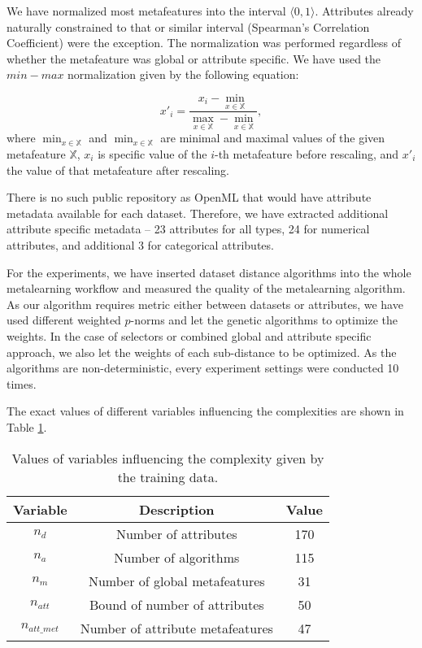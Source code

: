 \documentclass{article}
\begin{document}
\begin{refsegment}
We have normalized most metafeatures into the interval $\langle 0,1 \rangle$. Attributes already naturally constrained to that or similar interval (Spearman's Correlation Coefficient) were the exception. The normalization was performed regardless of whether the metafeature was global or attribute specific. We have used the $min-max$ normalization given by the following equation:

\begin{equation*}
x'_i=\frac{x_i - \min_{x \in \mathbb{X}}}{\max_{x \in \mathbb{X}}-\min_{x \in \mathbb{X}}},
\end{equation*}
where $\min_{x \in \mathbb{X}}$ and $\min_{x \in \mathbb{X}}$ are minimal and maximal values of the given metafeature $\mathbb{X}$, $x_i$ is specific value of the $i$-th metafeature before rescaling, and $x'_i$ the value of that metafeature after rescaling.

There is no such public repository as OpenML that would have attribute metadata available for each dataset.
Therefore, we have extracted additional attribute specific metadata -- 23 attributes for all types, 24 for numerical attributes, and additional 3 for categorical attributes.

For the experiments, we have inserted dataset distance algorithms into the whole metalearning workflow and measured the quality of the metalearning algorithm. As our algorithm requires metric either between datasets or attributes, we have used different weighted $p$-norms and let the genetic algorithms to optimize the weights. In the case of selectors or combined global and attribute specific approach, we also let the weights of each sub-distance to be optimized. As the algorithms are non-deterministic, every experiment settings were conducted 10 times.

The exact values of different variables influencing the complexities are shown in Table \ref{table:complexityVariablesValues}. 
\begin{table}[htbp]
	\caption{Values of variables influencing the complexity given by the training data.}
	\label{table:complexityVariablesValues}
	\centering
	\begin{tabular}{ |c | c | c | }
		\hline
		Variable & Description & Value \\
		\hline                       
		$n_d$ & Number of attributes &  170\\
		$n_a$ & Number of algorithms &  115 \\
		$n_m$ & Number of global metafeatures &  31 \\
		$n_{att}$ & Bound of number of attributes& 50   \\
		$n_{att\_met}$ & Number of attribute metafeatures & 47    \\
		\hline  
	\end{tabular}
\end{table} 


\end{refsegment}
\end{document}
